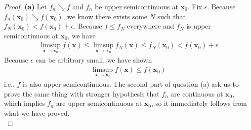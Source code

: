 \documentclass{report}
\begin{document}
\begin{proof}
\textbf{(a)} Let $f_n\searrow f$ and  $f_n$ be upper semicontinuous at  $\textbf{x}_0$. Fix $\epsilon $. Because $f_n (\textbf{x}_0) \searrow f(\textbf{x}_0)$, we know there exists some $N$ such that  $f_N(\textbf{x}_0)< f(\textbf{x}_0)+\epsilon $. Because $f\leq f_N$ everywhere and $f_N$ is upper semicontinuous at  $\textbf{x}_0$, we have
\begin{align*}
\limsup_{\textbf{x}\to \textbf{x}_0}f(\textbf{x})\leq \limsup_{\textbf{x}\to \textbf{x}_0}f_N(\textbf{x})\leq f_N(\textbf{x}_0)<f(\textbf{x}_0)+ \epsilon 
\end{align*}
Because $\epsilon $ can be arbitrary small, we have shown 
\begin{align*}
\limsup_{\textbf{x}\to \textbf{x}_0}f(\textbf{x})\leq f(\textbf{x}_0)
\end{align*}
i.e., $f$ is also upper semicontinuous. The second part of question (a) ask us to prove the same thing with stronger hypothesis that $f_n$ are continuous at  $\textbf{x}_0$, which implies $f_n$ are upper semicontinuous at $\textbf{x}_0$, so it immediately follows from what we have proved. \\


\end{proof}
\end{document}
